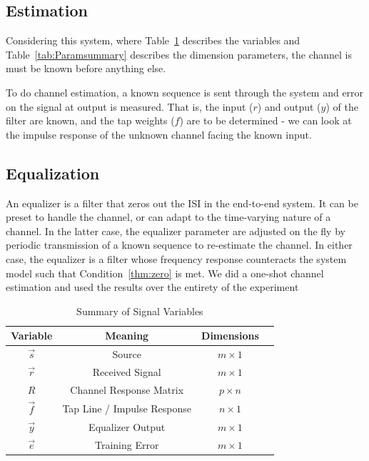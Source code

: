 \documentclass[]{article}
\newtheorem{thm}{Condition}
\begin{document}

\subsection{Estimation}
\label{sec:estimate}

Considering this system, where Table~\ref{tab:filtersummary} describes the variables and Table~\ref{tab:Paramsummary} describes the dimension parameters, the channel is must be known before anything else.

To do channel estimation, a known sequence is sent through the system and error on the signal at output is measured.  That is, the input ($r$) and output ($y$) of the filter are known, and the tap weights ($f$) are to be determined - we can look at the impulse response of the unknown channel facing the known input.  

\subsection{Equalization}
\label{sec:equal}
An equalizer is a filter that zeros out the ISI in the end-to-end system.  It can be preset to handle the channel, or can adapt to the time-varying nature of a channel.  In the latter case, the equalizer parameter are adjusted on the fly by periodic transmission of a known sequence to re-estimate the channel.  In either case, the equalizer is a filter whose frequency response counteracts the system model such that Condition~\ref{thm:zero} is met.  We did a one-shot channel estimation and used the results over the entirety of the experiment

\begin{table}[H]
\begin{center}
\begin{tabular}{|c|c|c|c|}
\hline Variable & Meaning & Dimensions \\
\hline \hline
$\vec{s}$ & Source & $m\times 1 $\\ \hline
$\vec{r}$ & Received Signal & $m\times 1$ \\ \hline
$R$ & Channel Response Matrix & $p\times n$ \\ \hline
$\vec{f}$ & Tap Line / Impulse Response & $n\times 1 $ \\ \hline
$\vec{y}$ & Equalizer Output & $ m\times 1 $ \\ \hline
 $\vec{e}$ & Training Error & $ m\times 1 $ \\ \hline
\end{tabular}
\caption{Summary of Signal Variables} \label{tab:filtersummary}
\end{center}
\end{table}
\end{document}
